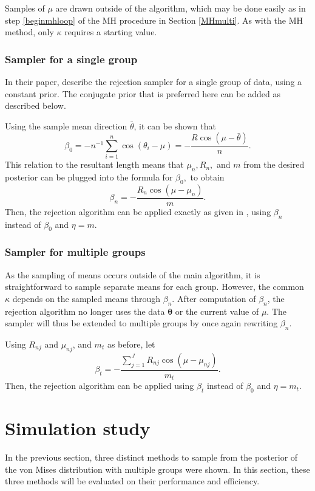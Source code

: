 \documentclass[]{gSCS2e}
\theoremstyle{plain}
\theoremstyle{definition}
\theoremstyle{remark}
\begin{document}
Samples of $\mu$ are drawn outside of the algorithm, which may be done easily as in step \ref{beginmhloop} of the MH procedure in Section \ref{MHmulti}. As with the MH method, only $\kappa$ requires a starting value. 

\subsubsection{Sampler for a single group}

In their paper, \citet{forbes2014fast} describe the rejection sampler for a single group of data, using a constant prior. The conjugate prior that is preferred here can be added as described below. 

Using the sample mean direction $\bar{\theta}$, it can be shown that
$$ \beta_0 = - n^{-1} \sum_{i=1}^{n} \cos(\theta_i - \mu) = - \frac{R\cos (\mu - \bar\theta) }{n}.$$
This relation to the resultant length means that $\mu_n, R_n,$ and $m$ from the desired posterior can be plugged into the formula for $\beta_0,$ to obtain
$$\beta_n = - \frac{R_{n} \cos (\mu - \mu_{n})}{m}.$$
Then, the rejection algorithm can be applied exactly as given in \citet{forbes2014fast}, using $\beta_n$ instead of $\beta_0$ and $\eta = m$.

\subsubsection{Sampler for multiple groups}

As the sampling of means occurs outside of the main algorithm, it is straightforward to sample separate means for each group. However, the common $\kappa$ depends on the sampled means through $\beta_n$. After computation of $\beta_n$, the rejection algorithm no longer uses the data $\boldsymbol\theta$ or the current value of $\mu$. The sampler will thus be extended to multiple groups by once again rewriting $\beta_n$. 

Using $R_{nj}$ and $\mu_{nj}$, and $m_t$ as before, let
$$\beta_t = -  \frac{\sum_{j=1}^{J} R_{nj} \cos (\mu - \mu_{nj})}{m_t}.$$
Then, the rejection algorithm can be applied using $\beta_t$ instead of $\beta_0$ and $\eta = m_t$.




\section{Simulation study \label{simstud}}

In the previous section, three distinct methods to sample from the posterior of the von Mises distribution with multiple groups were shown. In this section, these three methods will be evaluated on their performance and efficiency. 
\end{document}
